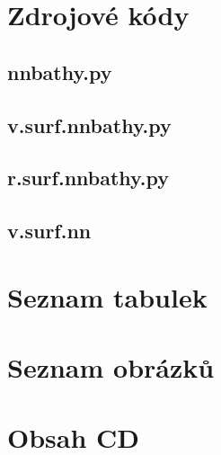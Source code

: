 \documentclass[12pt,a4paper]{article}
\begin{document}
\newpage
\section{Zdrojové kódy}
\subsection{nnbathy.py}
\label{app:nnbathy}


\bigskip
\subsection{v.surf.nnbathy.py}
\label{app:v.surf}


\newpage
\subsection{r.surf.nnbathy.py}
\label{app:r.surf}


\subsection{v.surf.nn}
\label{app:v.surf.nn}



\newpage
\section{Seznam tabulek}
\listoftables

\section{Seznam obrázků}
\listoffigures

\section{Obsah CD}
\end{document}

